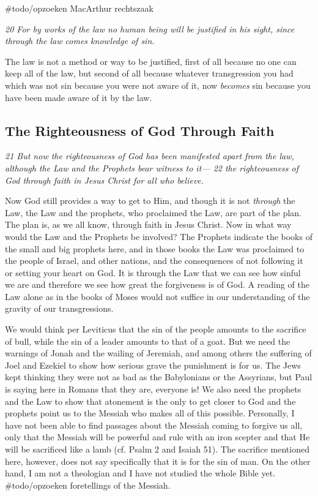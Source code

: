 \#todo/opzoeken MacArthur rechtszaak

\emph{20 For by works of the law no human being will be justified in his
sight, since through the law comes knowledge of sin.}

The law is not a method or way to be justified, first of all because no
one can keep all of the law, but second of all because whatever
transgression you had which was not sin because you were not aware of
it, now \emph{becomes} sin because you have been made aware of it by the
law.

\subsection{The Righteousness of God Through Faith} \emph{21 But now the
righteousness of God has been manifested apart from the law, although
the Law and the Prophets bear witness to it--- 22 the righteousness of
God through faith in Jesus Christ for all who believe.}

Now God still provides a way to get to Him, and though it is not
\emph{through} the Law, the Law and the prophets, who proclaimed the
Law, are part of the plan. The plan is, as we all know, through faith in
Jesus Christ. Now in what way would the Law and the Prophets be
involved? The Prophets indicate the books of the small and big prophets
here, and in those books the Law was proclaimed to the people of Israel,
and other nations, and the consequences of not following it or setting
your heart on God. It is through the Law that we can see how sinful we
are and therefore we see how great the forgiveness is of God. A reading
of the Law alone as in the books of Moses would not suffice in our
understanding of the gravity of our transgressions.

We would think per Leviticus that the sin of the people amounts to the
sacrifice of bull, while the sin of a leader amounts to that of a goat.
But we need the warnings of Jonah and the wailing of Jeremiah, and among
others the suffering of Joel and Ezekiel to show how serious grave the
punishment is for us. The Jews kept thinking they were not as bad as the
Babylonians or the Assyrians, but Paul is saying here in Romans that
they are, everyone is! We also need the prophets and the Law to show
that atonement is the only to get closer to God and the prophets point
us to the Messiah who makes all of this possible. Personally, I have not
been able to find passages about the Messiah coming to forgive us all,
only that the Messiah will be powerful and rule with an iron scepter and
that He will be sacrificed like a lamb (cf. Psalm 2 and Isaiah 51). The
sacrifice mentioned here, however, does not say specifically that it is
for the sin of man. On the other hand, I am not a theologian and I have
not studied the whole Bible yet. \#todo/opzoeken foretellings of the
Messiah.

